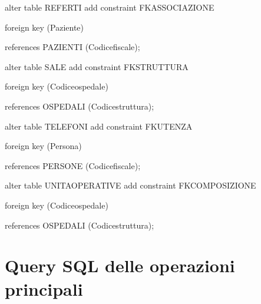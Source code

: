 \documentclass[a4paper,12pt]{report}
\begin{document}
\noindent alter table REFERTI add constraint FKASSOCIAZIONE

     foreign key (Paziente)

     references PAZIENTI (Codice\textunderscore fiscale); \newline

\noindent alter table SALE add constraint FKSTRUTTURA

     foreign key (Codice\textunderscore ospedale)

     references OSPEDALI (Codice\textunderscore struttura); \newline

\noindent alter table TELEFONI add constraint FKUTENZA

     foreign key (Persona)

     references PERSONE (Codice\textunderscore fiscale); \newline

\noindent alter table UNITA\textunderscore OPERATIVE add constraint FKCOMPOSIZIONE

     foreign key (Codice\textunderscore ospedale)
     
     references OSPEDALI (Codice\textunderscore struttura); \newline

\appendix 
\chapter{Query SQL delle operazioni principali}
\end{document}
